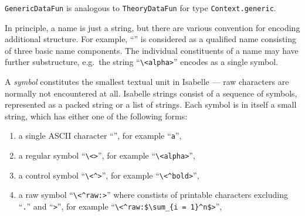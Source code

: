 \begin{isabellebody}
\begin{isamarkuptext}
\begin{description}
  \item \verb|GenericDataFun| is analogous to
  \verb|TheoryDataFun| for type \verb|Context.generic|.

  \end{description}%
\end{isamarkuptext}%
\isamarkuptrue%
%
\endisatagmlref
{\isafoldmlref}%
%
\isadelimmlref
%
\endisadelimmlref
%
\isamarkuptrue%
%
\begin{isamarkuptext}%
In principle, a name is just a string, but there are various
  convention for encoding additional structure.  For example, ``'' is considered as a qualified name consisting of
  three basic name components.  The individual constituents of a name
  may have further substructure, e.g.\ the string
  ``\verb,\,\verb,<alpha>,'' encodes as a single symbol.%
\end{isamarkuptext}%
\isamarkuptrue%
%
\isamarkuptrue%
%
\begin{isamarkuptext}%

  A \emph{symbol} constitutes the smallest textual unit in Isabelle
  --- raw characters are normally not encountered at all.  Isabelle
  strings consist of a sequence of symbols, represented as a packed
  string or a list of strings.  Each symbol is in itself a small
  string, which has either one of the following forms:

  \begin{enumerate}

  \item a single ASCII character ``'', for example
  ``\verb,a,'',

  \item a regular symbol ``\verb,\,\verb,<,\verb,>,'',
  for example ``\verb,\,\verb,<alpha>,'',

  \item a control symbol ``\verb,\,\verb,<^,\verb,>,'',
  for example ``\verb,\,\verb,<^bold>,'',

  \item a raw symbol ``\verb,\,\verb,<^raw:,\verb,>,''
  where  constists of printable characters excluding
  ``\verb,.,'' and ``\verb,>,'', for example
  ``\verb,\,\verb,<^raw:$\sum_{i = 1}^n$>,'',


\end{enumerate}
\end{isamarkuptext}
\end{isabellebody}
